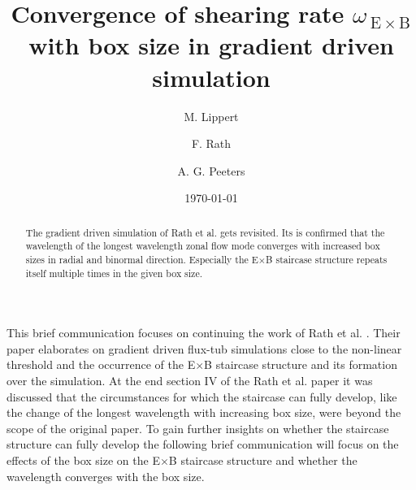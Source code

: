 \documentclass[aip, amsmath, amssymb, reprint, twocolumn]{revtex4-1}
\begin{document}

\title[Convergence of shearing rate $\omega_{\mathrm{\:E}\times\mathrm{B}}$ with box size in gradient driven simulation]{
	Convergence of shearing rate $\omega_{\mathrm{\:E}\times\mathrm{B}}$ with box size in gradient driven simulation
}

\author{M. Lippert}
\author{F. Rath}
\author{A. G. Peeters}

\date{\today}


\begin{abstract}
	The gradient driven simulation of Rath et al.\cite{doi:10.1063/1.4961231} gets revisited. Its is confirmed that the wavelength of the longest wavelength zonal flow mode converges with increased box sizes in radial and binormal direction. Especially the E$\times$B staircase structure repeats itself multiple times in the given box size. %
\end{abstract}

\maketitle




This brief communication focuses on continuing the work of Rath et al. \cite{doi:10.1063/1.4961231}. 
Their paper elaborates on gradient driven flux-tub simulations close to the non-linear threshold and the occurrence of the E$\times$B staircase structure and its formation over the simulation.
At the end section IV of the Rath et al. paper it was discussed that the circumstances for which the staircase can fully develop, like the change of the longest wavelength with increasing box size, were beyond the scope of the original paper.
To gain further insights on whether the staircase structure can fully develop the following brief communication will focus on the effects of the box size on the E$\times$B staircase structure and whether the wavelength converges with the box size.\bigskip
\end{document}
